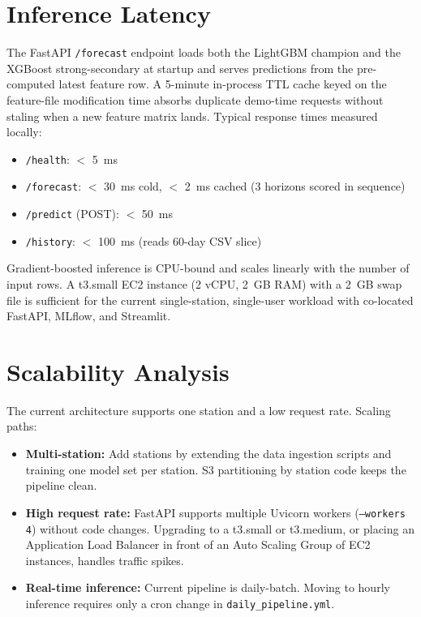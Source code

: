 \section{Inference Latency}

The FastAPI \texttt{/forecast} endpoint loads both the LightGBM champion and the
XGBoost strong-secondary at startup and serves predictions from the pre-computed
latest feature row. A 5-minute in-process TTL cache keyed on the feature-file
modification time absorbs duplicate demo-time requests without staling when a new
feature matrix lands. Typical response times measured locally:

\begin{itemize}
    \item \texttt{/health}: $<$ 5~ms
    \item \texttt{/forecast}: $<$ 30~ms cold, $<$ 2~ms cached (3 horizons scored in sequence)
    \item \texttt{/predict} (POST): $<$ 50~ms
    \item \texttt{/history}: $<$ 100~ms (reads 60-day CSV slice)
\end{itemize}

Gradient-boosted inference is CPU-bound and scales linearly with the number of
input rows. A t3.small EC2 instance (2 vCPU, 2~GB RAM) with a 2~GB swap file is
sufficient for the current single-station, single-user workload with co-located
FastAPI, MLflow, and Streamlit.

\section{Scalability Analysis}

The current architecture supports one station and a low request rate.
Scaling paths:

\begin{itemize}
    \item \textbf{Multi-station:} Add stations by extending the data ingestion scripts
          and training one model set per station. S3 partitioning by station code
          keeps the pipeline clean.
    \item \textbf{High request rate:} FastAPI supports multiple Uvicorn workers
          (\texttt{--workers 4}) without code changes. Upgrading to a t3.small
          or t3.medium, or placing an Application Load Balancer in front of an
          Auto Scaling Group of EC2 instances, handles traffic spikes.
    \item \textbf{Real-time inference:} Current pipeline is daily-batch. Moving to
          hourly inference requires only a cron change in \texttt{daily\_pipeline.yml}.
\end{itemize}


